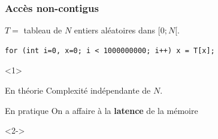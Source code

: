 \documentclass[xcolor={x11names,svgnames}, 14pt]{beamer}
\begin{document}

\begin{frame}[fragile,label=pointer_jumping]
  \frametitle{Accès non-contigus}

  $T =$ tableau de $N$ entiers aléatoires dans $[0; N[$.

  \smallskip
  
\begin{verbatim}
for (int i=0, x=0; i < 1000000000; i++) x = T[x];
\end{verbatim}
\begin{overlayarea}{\textwidth}{6.5cm}
  \begin{onlyenv}<1>
    \bigskip
    \begin{exampleblock}{En théorie}
      Complexité indépendante de $N$.
    \end{exampleblock}

    \medskip

    \begin{alertblock}{En pratique}
      On a affaire à la \textbf{latence} de la mémoire
    \end{alertblock}

\end{onlyenv}
  \begin{onlyenv}<2->
    \begin{center}
      \vspace{-0.33cm}
    \end{center}
\end{onlyenv}
\end{overlayarea}
\end{frame}
\end{document}
